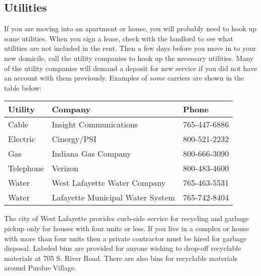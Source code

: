 \subsection{Utilities}

If you are moving into an apartment or house, you will probably need to hook up some utilities. When you sign a lease, check with the landlord to see what utilities are not included in the rent. Then a few days before you move in to your new domicile, call the utility companies to hook up the necessary utilities. Many of the utility companies will demand a deposit for new service if you did not have an account with them previously. Examples of \emph{some} carriers are shown in the table below:

\begin{table}[h]
	\centering
	\begin{tabular}{@{}lll@{}}
		\toprule
		\textbf{Utility} & \textbf{Company} & \textbf{Phone} \\
		\midrule
		Cable & Insight Communications & 765-447-6886 \\
		Electric & Cinergy/PSI & 800-521-2232 \\
		Gas & Indiana Gas Company & 800-666-3090 \\
		Telephone & Verizon & 800-483-4600 \\
		Water & West Lafayette Water Company & 765-463-5531 \\
		Water & Lafayette Municipal Water System & 765-742-8404 \\
		\bottomrule
	\end{tabular}
\end{table}


The city of West Lafayette provides curb-side service for recycling and garbage pickup only for houses with four units or less. If you live in a complex or house with more than four units then a private contractor must be hired for garbage disposal. Labeled bins are provided for anyone wishing to drop-off recyclable materials at 705 S. River Road. There are also bins for recyclable materials around Purdue Village.